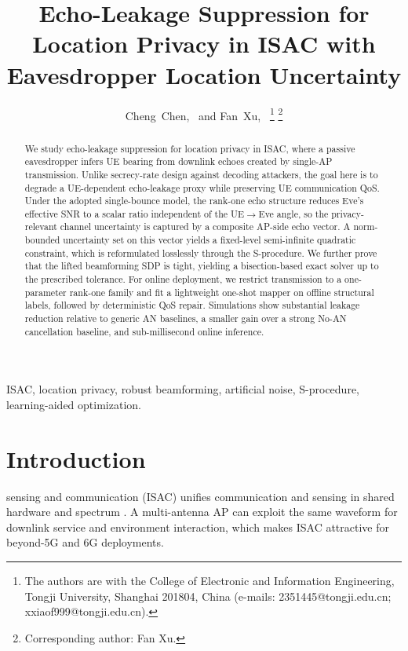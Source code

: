 \documentclass[journal]{IEEEtran}
\begin{document}
\title{Echo-Leakage Suppression for Location Privacy in ISAC with Eavesdropper Location Uncertainty}

\author{Cheng~Chen,~
    and Fan~Xu,~%
\thanks{The authors are with the College of Electronic and Information Engineering, Tongji University, Shanghai 201804, China (e-mails: 2351445@tongji.edu.cn; xxiaof999@tongji.edu.cn). }%
\thanks{Corresponding author: Fan Xu.}}

\maketitle

\begin{abstract}
We study echo-leakage suppression for location privacy in ISAC, where a passive eavesdropper infers UE bearing from downlink echoes created by single-AP transmission. Unlike secrecy-rate design against decoding attackers, the goal here is to degrade a UE-dependent echo-leakage proxy while preserving UE communication QoS. Under the adopted single-bounce model, the rank-one echo structure reduces Eve's effective SNR to a scalar ratio independent of the UE$\rightarrow$Eve angle, so the privacy-relevant channel uncertainty is captured by a composite AP-side echo vector. A norm-bounded uncertainty set on this vector yields a fixed-level semi-infinite quadratic constraint, which is reformulated losslessly through the S-procedure. We further prove that the lifted beamforming SDP is tight, yielding a bisection-based exact solver up to the prescribed tolerance. For online deployment, we restrict transmission to a one-parameter rank-one family and fit a lightweight one-shot mapper on offline structural labels, followed by deterministic QoS repair. Simulations show substantial leakage reduction relative to generic AN baselines, a smaller gain over a strong No-AN cancellation baseline, and sub-millisecond online inference.
\end{abstract}

\begin{IEEEkeywords}
ISAC, location privacy, robust beamforming, artificial noise, S-procedure, learning-aided optimization.
\end{IEEEkeywords}

\section{Introduction}
 sensing and communication (ISAC) unifies communication and sensing in shared hardware and spectrum \cite{liu2023integrated,giordani2020toward}. A multi-antenna AP can exploit the same waveform for downlink service and environment interaction, which makes ISAC attractive for beyond-5G and 6G deployments.
\end{document}
